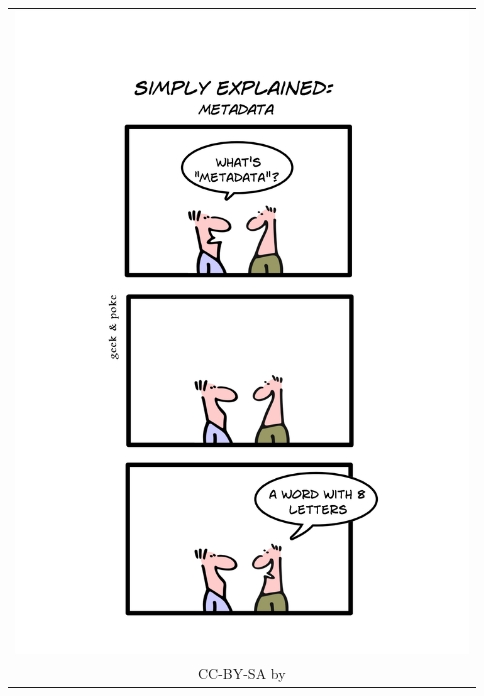 \thispagestyle{empty}
\cleardoublepage

\thispagestyle{empty}
\begin{center}
\vspace*{\fill}
\begin{tabular}{c}
\includegraphics[width=12cm]{img/geekandpokemetadata.jpg} \\
CC-BY-SA by \textcite{Widder2010} \\
\end{tabular}
\vfill
\end{center}



\begin{otherlanguage}{ngerman}

\end{otherlanguage}

\cleardoublepage

\tableofcontents

\begingroup
\let\cleardoublepage\relax
\let\clearpage\relax
\makeatletter\renewcommand*{\float@listhead}[1]{\unnumberedsection{#1}}\makeatother
{}
\listoffigures
\listoftables
\endgroup
